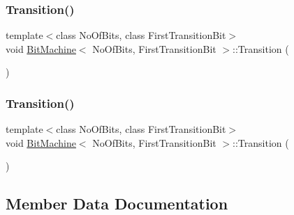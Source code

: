 \subsubsection{\texorpdfstring{Transition()}{Transition()}\hspace{0.1cm}{\footnotesize\ttfamily [9/10]}}
{\footnotesize\ttfamily template$<$class No\+Of\+Bits, class First\+Transition\+Bit$>$ \\
void \mbox{\hyperlink{struct_bit_machine}{Bit\+Machine}}$<$ No\+Of\+Bits, First\+Transition\+Bit $>$\+::Transition (\begin{DoxyParamCaption}\item[{const \mbox{\hyperlink{struct_ev_flip_bit}{Ev\+Flip\+Bit}}$<$ \mbox{\hyperlink{_performance_8cpp_acf7191ac01fae99fae3f5a89e4f8a8ff}{uint8}} $>$ \&}]{ }\end{DoxyParamCaption})\hspace{0.3cm}{\ttfamily [inline]}}

\mbox{\label{struct_bit_machine_a3ef5a60f15cd15bb46b63d2a86594c5a}} 
\subsubsection{\texorpdfstring{Transition()}{Transition()}\hspace{0.1cm}{\footnotesize\ttfamily [10/10]}}
{\footnotesize\ttfamily template$<$class No\+Of\+Bits, class First\+Transition\+Bit$>$ \\
void \mbox{\hyperlink{struct_bit_machine}{Bit\+Machine}}$<$ No\+Of\+Bits, First\+Transition\+Bit $>$\+::Transition (\begin{DoxyParamCaption}\item[{const \mbox{\hyperlink{struct_ev_flip_bit}{Ev\+Flip\+Bit}}$<$ \mbox{\hyperlink{_performance_8cpp_ac1d5f5aee5a76e77d960741a1bd84b12}{uint9}} $>$ \&}]{ }\end{DoxyParamCaption})\hspace{0.3cm}{\ttfamily [inline]}}



\subsection{Member Data Documentation}
\mbox{\label{struct_bit_machine_ad35b2868f25bc77b9b9db1f1e9d03c8b}} 
